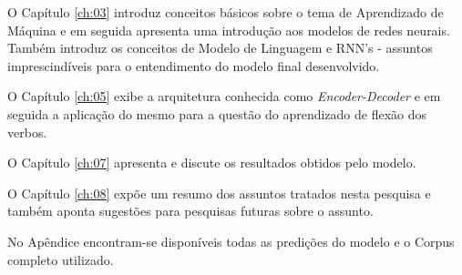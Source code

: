 O Capítulo \ref{ch:03} introduz conceitos básicos sobre o tema de Aprendizado de Máquina e em seguida apresenta uma introdução  aos modelos de redes neurais. Também introduz os conceitos de Modelo de Linguagem e RNN's - assuntos imprescindíveis para o entendimento do modelo final desenvolvido.

O Capítulo \ref{ch:05} exibe a arquitetura conhecida como \textit{Encoder-Decoder} e em seguida a aplicação do mesmo para a questão do aprendizado de flexão dos verbos. 

O Capítulo \ref{ch:07} apresenta e discute os resultados obtidos pelo modelo.

O Capítulo \ref{ch:08} expõe um resumo dos assuntos tratados nesta pesquisa e também aponta sugestões para pesquisas futuras sobre o assunto.

No Apêndice encontram-se disponíveis todas as predições do modelo e o Corpus completo utilizado.

